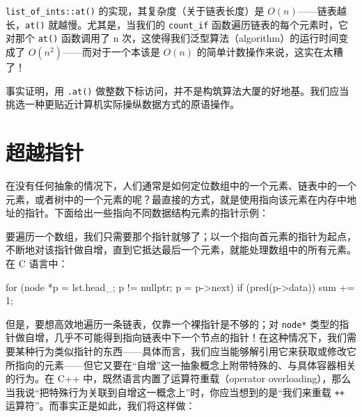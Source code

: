 \texttt{list\_\allowbreak{}of\_\allowbreak{}ints::\allowbreak{}at(\allowbreak{})\allowbreak{}} 的实现，其复杂度（关于链表长度）是 $O(n)$——链表越长，\texttt{at(\allowbreak{})\allowbreak{}} 就越慢。尤其是，当我们的 \texttt{count\_\allowbreak{}if} 函数遍历链表的每个元素时，它对那个 \texttt{at(\allowbreak{})\allowbreak{}} 函数调用了 n 次，这使得我们泛型算法（algorithm）的运行时间变成了 $O(n^2)$——而对于一个本该是 $O(n)$ 的简单计数操作来说，这实在太糟了！

事实证明，用 \texttt{.at(\allowbreak{})\allowbreak{}} 做整数下标访问，并不是构筑算法大厦的好地基。我们应当挑选一种更贴近计算机实际操纵数据方式的原语操作。

\section{超越指针}

在没有任何抽象的情况下，人们通常是如何定位数组中的一个元素、链表中的一个元素，或者树中的一个元素的呢？最直接的方式，就是使用指向该元素在内存中地址的指针。下面给出一些指向不同数据结构元素的指针示例：


要遍历一个数组，我们只需要那个指针就够了；以一个指向首元素的指针为起点，不断地对该指针做自增，直到它抵达最后一个元素，就能处理数组中的所有元素。在 C 语言中：

\begin{codebox}[cpp]
    for (node *p = lst.head_; p != nullptr; p = p->next) {
      if (pred(p->data)) {
        sum += 1;
      }
   }
\end{codebox}

但是，要想高效地遍历一条链表，仅靠一个裸指针是不够的；对 \texttt{node*} 类型的指针做自增，几乎不可能得到指向链表中下一个节点的指针！在这种情况下，我们需要某种行为类似指针的东西——具体而言，我们应当能够解引用它来获取或修改它所指向的元素——但它又要在“自增”这一抽象概念上附带特殊的、与具体容器相关的行为。在 C++ 中，既然语言内置了运算符重载（operator overloading），那么当我说“把特殊行为关联到自增这一概念上”时，你应当想到的是“我们来重载 \texttt{++} 运算符”。而事实正是如此，我们将这样做：

